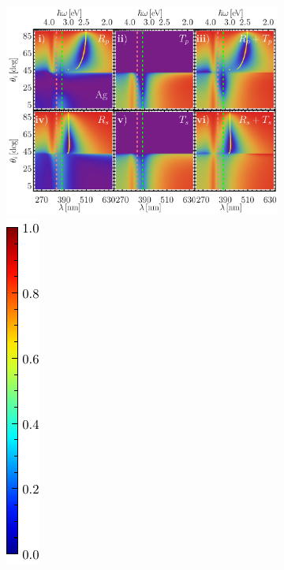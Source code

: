 \begin{figure}[h!]
	\begin{subfigure}{.01\linewidth}\caption{}\label{sfig:RT-10}\vspace{6.5cm}\end{subfigure}\hspace*{-1em}
	\begin{subfigure}{.7\linewidth}\centering
	\includegraphics[scale=.58 ]{2-Resultados/figs/10-RT-AuAg/0-2D_Grid_2.png}%
		\includegraphics[scale=.89, trim={00 -5 00 00}, clip]{2-Resultados/figs/0-IBar_v}
		\end{subfigure}\vspace*{-.5em}

\end{figure}
